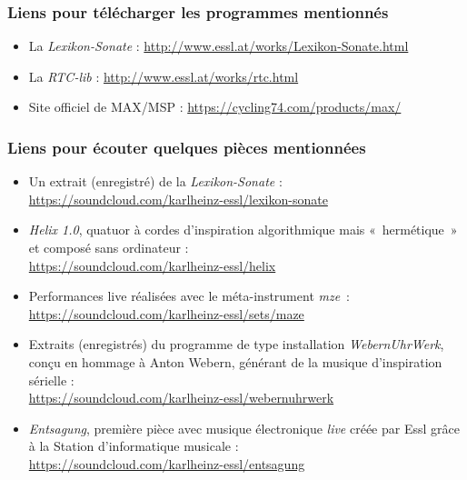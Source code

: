 \documentclass[a4paper,12pt]{article}
\newcommand{\guill}[1]{«~#1~»}
\newcommand{\maze}[0]{\emph{m\symbol{64}ze\textdegree2}}
\begin{document}
\subsubsection*{Liens pour télécharger les programmes mentionnés}

\begin{itemize}
\item La \emph{Lexikon-Sonate} : \href{http://www.essl.at/works/Lexikon-Sonate.html}{http://www.essl.at/works/Lexikon-Sonate.html}
\item La \emph{RTC-lib} : \href{http://www.essl.at/works/rtc.html}{http://www.essl.at/works/rtc.html}
\item Site officiel de MAX/MSP : \href{https://cycling74.com/products/max/}{https://cycling74.com/products/max/}
\end{itemize}

\subsubsection*{Liens pour écouter quelques pièces mentionnées}

\begin{itemize}
\item Un extrait (enregistré) de la \emph{Lexikon-Sonate} : \\ \href{https://soundcloud.com/karlheinz-essl/lexikon-sonate}{https://soundcloud.com/karlheinz-essl/lexikon-sonate}
\item \emph{Helix 1.0}, quatuor à cordes d'inspiration algorithmique mais \guill{hermétique} et composé sans ordinateur : \\ \href{https://soundcloud.com/karlheinz-essl/helix}{https://soundcloud.com/karlheinz-essl/helix}
\item Performances live réalisées avec le méta-instrument \maze~: \\ \href{https://soundcloud.com/karlheinz-essl/sets/maze}{https://soundcloud.com/karlheinz-essl/sets/maze}
\item Extraits (enregistrés) du programme de type installation \emph{WebernUhrWerk}, conçu en hommage à Anton Webern, générant de la musique d'inspiration sérielle : \\ \href{https://soundcloud.com/karlheinz-essl/webernuhrwerk}{https://soundcloud.com/karlheinz-essl/webernuhrwerk}
\item \emph{Entsagung}, première pièce avec musique électronique \emph{live} créée par Essl grâce à la Station d'informatique musicale : \\ \href{https://soundcloud.com/karlheinz-essl/entsagung}{https://soundcloud.com/karlheinz-essl/entsagung}
\end{itemize}
\end{document}
